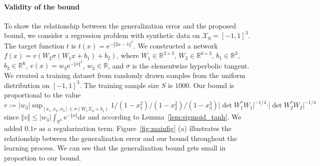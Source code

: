 \documentclass[twoside]{article}
\def\mcl#1{\mathcal{#1}}
\def\mr{\mathrm}
\begin{document}
\paragraph{Validity of the bound}
To show the relationship between the generalization error and the proposed bound, we consider a regression problem with synthetic data on $\mcl{X}_0=[-1,1]^3$.
The target function $t$ is $t(x)=\mr{e}^{-\Vert 2x-1\Vert^2}$.
We constructed a network $f(x)=v(W_2\sigma (W_1x+b_1)+b_2)$, where $W_1\in\mathbb{R}^{3\times 3}$, $W_2\in\mathbb{R}^{6\times 3}$, $b_1\in\mathbb{R}^{3}$, $b_2\in\mathbb{R}^{6}$, $v(x)=w_3\mr{e}^{-\Vert x\Vert^2}$, $w_3\in \mathbb{R}$, and $\sigma$ is the elementwise hyperbolic tangent. 
We created a training dataset from randomly drawn samples from the uniform distribution on $[-1,1]^3$.
The training sample size $S$ is $1000$.
Our bound is proportional to the value $r:=\vert w_3\vert\sup_{[x_1,x_2,x_3]\in \sigma(W_1\mcl{X}_0+b_1)}1/(1-x_1^2)/(1-x_2^2)/(1-x_3^3)\vert\det W_1^*W_1\vert^{-1/4}\cdot\vert\det W_2^*W_2\vert^{-1/4}$ since $\Vert v\Vert\le \vert w_3\vert\int_{\mathbb{R}^6}\mr{e}^{-\Vert x\Vert}\mr{d}x$ and according to Lemma~\ref{lem:sigmoid_tanh}.
We added $0.1r$ as a regularization term.
Figure~\ref{fig:mainfig} (a) illustrates the relationship between the generalization error and our bound throughout the learning process.
We can see that the generalization bound gets small in proportion to our bound.

\end{document}
